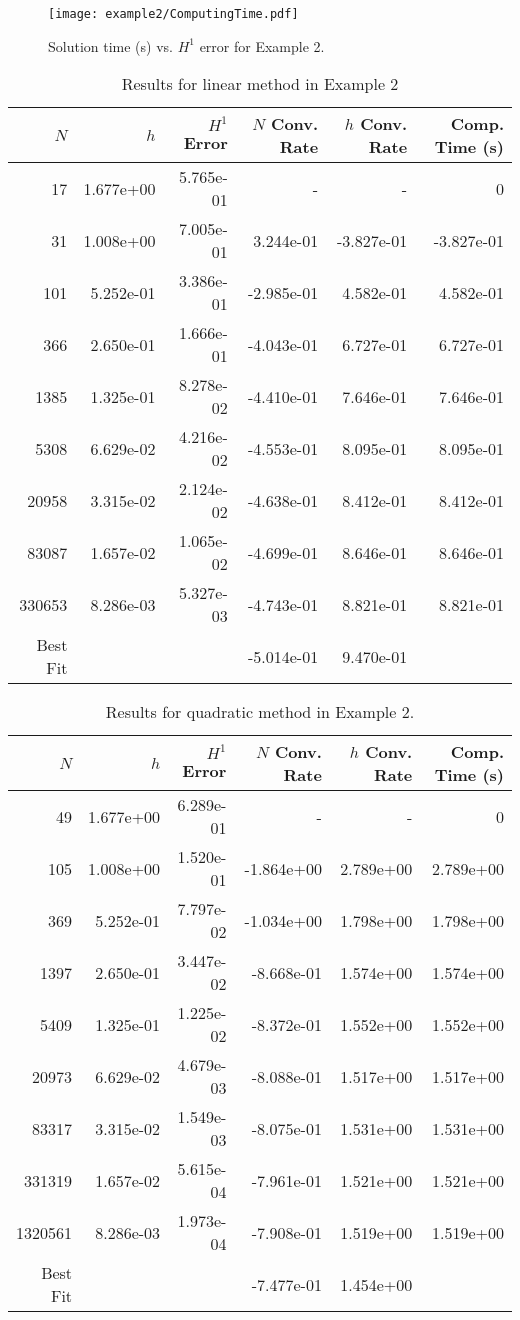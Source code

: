 \documentclass{article}
\begin{document}
\begin{figure}
\texttt{[image: example2/ComputingTime.pdf]}
\caption{Solution time (s) vs. $H^1$ error for Example 2.}
\label{fig:example2-time}
\end{figure}



\begin{table}
\begin{tabular}{|r|r|r|r|r|r|}
\hline
$N$&$h$&$H^1$ Error&$N$ Conv. Rate &$h$ Conv. Rate&Comp. Time (s)\\ 
\hline
\hline
17&1.677e+00&5.765e-01&-&-&0\\ 
31&1.008e+00&7.005e-01&3.244e-01&-3.827e-01&-3.827e-01\\ 
101&5.252e-01&3.386e-01&-2.985e-01&4.582e-01&4.582e-01\\ 
366&2.650e-01&1.666e-01&-4.043e-01&6.727e-01&6.727e-01\\ 
1385&1.325e-01&8.278e-02&-4.410e-01&7.646e-01&7.646e-01\\ 
5308&6.629e-02&4.216e-02&-4.553e-01&8.095e-01&8.095e-01\\ 
20958&3.315e-02&2.124e-02&-4.638e-01&8.412e-01&8.412e-01\\ 
83087&1.657e-02&1.065e-02&-4.699e-01&8.646e-01&8.646e-01\\ 
330653&8.286e-03&5.327e-03&-4.743e-01&8.821e-01&8.821e-01\\ 
\hline
Best Fit&&&-5.014e-01&9.470e-01&\\ 
\hline
\end{tabular}
\caption{Results for linear method in Example 2}
\label{tab:example2-linear}
\end{table}

\begin{table}
\begin{tabular}{|r|r|r|r|r|r|}
\hline
$N$&$h$&$H^1$ Error&$N$ Conv. Rate &$h$ Conv. Rate&Comp. Time (s)\\ 
\hline
\hline
49&1.677e+00&6.289e-01&-&-&0\\ 
105&1.008e+00&1.520e-01&-1.864e+00&2.789e+00&2.789e+00\\ 
369&5.252e-01&7.797e-02&-1.034e+00&1.798e+00&1.798e+00\\ 
1397&2.650e-01&3.447e-02&-8.668e-01&1.574e+00&1.574e+00\\ 
5409&1.325e-01&1.225e-02&-8.372e-01&1.552e+00&1.552e+00\\ 
20973&6.629e-02&4.679e-03&-8.088e-01&1.517e+00&1.517e+00\\ 
83317&3.315e-02&1.549e-03&-8.075e-01&1.531e+00&1.531e+00\\ 
331319&1.657e-02&5.615e-04&-7.961e-01&1.521e+00&1.521e+00\\ 
1320561&8.286e-03&1.973e-04&-7.908e-01&1.519e+00&1.519e+00\\ 
\hline
Best Fit&&&-7.477e-01&1.454e+00&\\ 
\hline
\end{tabular}
\caption{Results for quadratic method in Example 2.}
\label{tab:example2-quadratic}
\end{table}
\end{document}
